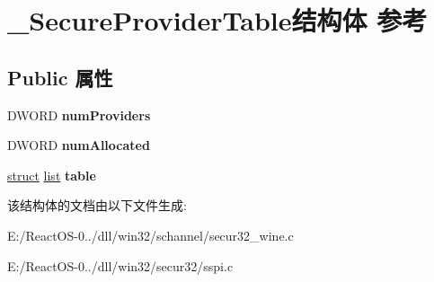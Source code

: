 \hypertarget{struct___secure_provider_table}{}\section{\+\_\+\+Secure\+Provider\+Table结构体 参考}
\label{struct___secure_provider_table}
\subsection*{Public 属性}
\begin{DoxyCompactItemize}
\item 
\mbox{\label{struct___secure_provider_table_a52bed469b6be5590884ed40a7a2b2e02}} 
D\+W\+O\+RD {\bfseries num\+Providers}
\item 
\mbox{\label{struct___secure_provider_table_acdae83be28e545ee1a9835b8596b4c2b}} 
D\+W\+O\+RD {\bfseries num\+Allocated}
\item 
\mbox{\label{struct___secure_provider_table_ace1dc4d91c7021e42a8a30bbf8c3015c}} 
\hyperlink{interfacestruct}{struct} \hyperlink{classlist}{list} {\bfseries table}
\end{DoxyCompactItemize}


该结构体的文档由以下文件生成\+:\begin{DoxyCompactItemize}
\item 
E\+:/\+React\+O\+S-\/0../dll/win32/schannel/secur32\+\_\+wine.\+c\item 
E\+:/\+React\+O\+S-\/0../dll/win32/secur32/sspi.\+c\end{DoxyCompactItemize}
